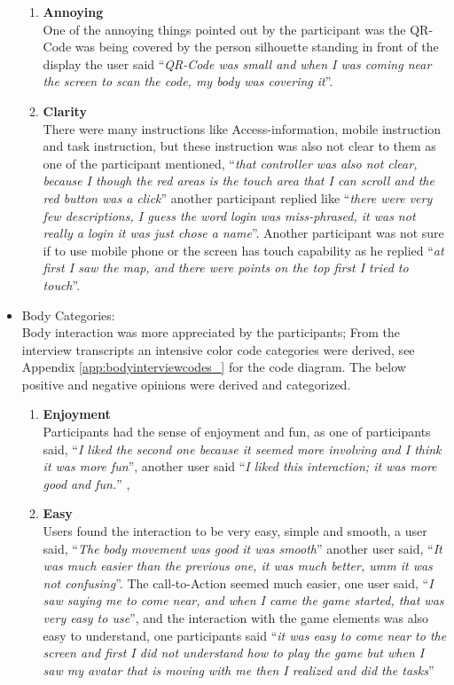 \begin{itemize}
\begin{enumerate}
\item	\textbf{Annoying}\\
One of the annoying things pointed out by the participant was the QR-Code was being covered by the person silhouette standing in front of the display the user said ``\emph{QR-Code was small and when I was coming near the screen to scan the code, my body was covering it}''.

\item	\textbf{Clarity}\\
There were many instructions like Access-information, mobile instruction and task instruction, but these instruction was also not clear to them as one of the participant mentioned, ``\emph{that controller was also not clear, because I though the red areas is the touch area that I can scroll and the red button was a click}'' another participant replied like ``\emph{there were very few descriptions, I guess the word login was miss-phrased, it was not really a login it was just chose a name}''. Another participant was not sure if to use mobile phone or the screen has touch capability as he replied ``\emph{at first I saw the map, and there were points on the top first I tried to touch}''.


\end{enumerate}


\item Body Categories: \\
Body interaction was more appreciated by the participants; From the interview transcripts an intensive color code categories were derived, see Appendix \ref{app:bodyinterviewcodes_} for the code diagram. The below positive and negative opinions were derived and categorized. 

\begin{enumerate}
\item	\textbf{Enjoyment}\\
Participants had the sense of enjoyment and fun, as one of participants said, ``\emph{I liked the second one because it seemed more involving and I think it was more fun}'', another user said ``\emph{I liked this interaction; it was more good and fun.}'' , 

\item	\textbf{Easy}\\
Users found the interaction to be very easy, simple and smooth, a user said, ``\emph{The body movement was good it was smooth}'' another user said, ``\emph{It was much easier than the previous one, it was much better, umm it was not confusing}''. The call-to-Action seemed much easier, one user said, ``\emph{I saw saying me to come near, and when I came the game started, that was very easy to use}'', and the interaction with the game elements was also easy to understand, one participants said ``\emph{it was easy to come near to the screen and first I did not understand how to play the game but when I saw my avatar that is moving with me then I realized and did the tasks}''


\end{enumerate}
\end{itemize}
